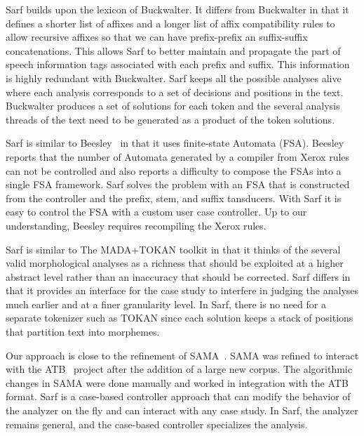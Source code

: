 \documentclass[11pt]{article}
\begin{document}
Sarf builds upon the lexicon of Buckwalter.
It differs from Buckwalter in that it defines a shorter list of affixes
and a longer list of affix compatibility rules to allow recursive 
affixes so that we can have prefix-prefix an suffix-suffix 
concatenations.
This allows Sarf to better maintain and propagate 
the part of speech information
tags associated with each prefix and suffix.
This information is highly 
redundant with Buckwalter.%
Sarf keeps all the possible analyses alive where each analysis
corresponds to a set of decisions and positions in the text. 
Buckwalter produces a set of solutions for each token 
and the several analysis threads of the text need to be 
generated as a product of the token solutions. 

Sarf is similar to Beesley~ in that it uses
finite-state Automata (FSA). 
Beesley reports that the number of Automata generated by a compiler
from Xerox rules can not be controlled and also reports a 
difficulty to 
compose the FSAs into a single FSA framework. 
Sarf solves the problem with an FSA that is constructed from 
the controller and 
the prefix, stem, and suffix tansducers. 
With Sarf it is easy to control the FSA with a custom user case 
controller. 
Up to our understanding, Beesley  
requires recompiling the Xerox rules.

Sarf is similar to The MADA+TOKAN toolkit in that it thinks of
the several valid morphological analyses as a richness that 
should be exploited at a higher abstract level rather than
an inaccuracy that should be corrected. 
Sarf differs in that it provides an interface for the 
case study to interfere in judging the analyses much earlier and
at a finer granularity level. 
In Sarf, there is no need for a separate tokenizer such as
TOKAN since each solution keeps a stack of positions 
that partition text into morphemes. 


Our approach is close to the refinement of SAMA~\cite{Maamouri:10}.
SAMA was refined to interact with
the ATB~\cite{Maamouri:04} project after the addition of a large 
new corpus. 
The algorithmic changes in SAMA were 
done manually and worked in integration with the ATB format. 
Sarf is a case-based controller approach that can modify 
the behavior of the analyzer on the fly and can interact
with any case study. 
In Sarf, the analyzer remains general, and the 
case-based controller specializes the analysis.
\end{document}
